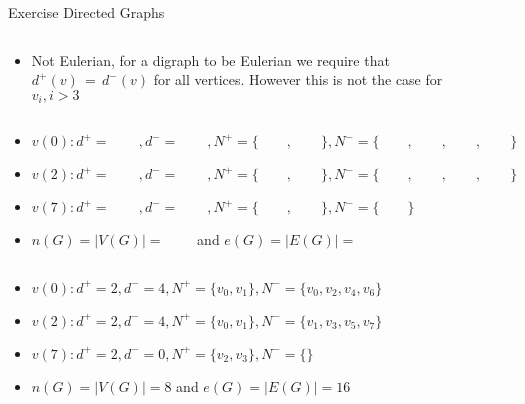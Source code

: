 \begin{frame}[allowframebreaks]{Exercise \thesection}{Directed Graphs}
\begin{solution}
\begin{columns}
\begin{column}{0.5\textwidth}
\begin{itemize}
            \begin{itemize}
              \item Not Eulerian, for a digraph to be Eulerian we require that $d^{+}(v)\,=\,d^{-}(v)$ for all vertices. However this is not the case for $v_i, i > 3$
            \end{itemize}
        \end{itemize}
      \end{column}
      \begin{column}{0.5\textwidth}
      \end{column}
    \end{columns}
  \end{solution}
  \begin{exercisenoinc}
    \begin{itemize}
      \item $v(0): d^{+}=\qquad ,d^{-}=\qquad ,N^{+}=\{\qquad, \qquad\},N^{-}=\{\qquad ,\qquad ,\qquad ,\qquad \}$
      \item $v(2): d^{+}=\qquad ,d^{-}=\qquad ,N^{+}=\{\qquad, \qquad\},N^{-}=\{\qquad ,\qquad ,\qquad ,\qquad \}$
      \item $v(7): d^{+}=\qquad ,d^{-}=\qquad ,N^{+}=\{\qquad, \qquad\},N^{-}=\{\qquad \}$
      \item $n(G)=|V(G)|=\qquad$ and $e(G)=|E(G)|=\qquad$
    \end{itemize}
  \end{exercisenoinc}
  \begin{solution}
    \begin{columns}
      \begin{column}{0.5\textwidth}
        \begin{itemize}
          \item $v(0): d^{+}=2,d^{-}=4,N^{+}=\{v_{0},v_{1}\},N^{-}=\{v_{0},v_{2},v_{4},v_{6}\}$
          \item $v(2): d^{+}=2,d^{-}=4,N^{+}=\{v_{0},v_{1}\},N^{-}=\{v_{1},v_{3},v_{5},v_{7}\}$
          \item $v(7): d^{+}=2,d^{-}=0,N^{+}=\{v_{2},v_{3}\},N^{-}=\{\}$
          \item $n(G)=|V(G)|=8$ and $e(G)=|E(G)|=16$
        \end{itemize}
      \end{column}
      \begin{column}{0.5\textwidth}
      \end{column}
    \end{columns}
  \end{solution}

\end{frame}
